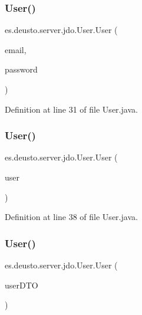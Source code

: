 \subsubsection{\texorpdfstring{User()}{User()}\hspace{0.1cm}{\footnotesize\ttfamily [1/3]}}
{\footnotesize\ttfamily es.\+deusto.\+server.\+jdo.\+User.\+User (\begin{DoxyParamCaption}\item[{String}]{email,  }\item[{String}]{password }\end{DoxyParamCaption})}



Definition at line 31 of file User.\+java.

\mbox{\label{classes_1_1deusto_1_1server_1_1jdo_1_1_user_a045d3217e3e459cd505de75ebb88243e}} 
\subsubsection{\texorpdfstring{User()}{User()}\hspace{0.1cm}{\footnotesize\ttfamily [2/3]}}
{\footnotesize\ttfamily es.\+deusto.\+server.\+jdo.\+User.\+User (\begin{DoxyParamCaption}\item[{\mbox{\hyperlink{classes_1_1deusto_1_1server_1_1data_1_1_user_details_d_t_o}{User\+Details\+D\+TO}}}]{user }\end{DoxyParamCaption})}



Definition at line 38 of file User.\+java.

\mbox{\label{classes_1_1deusto_1_1server_1_1jdo_1_1_user_aba393844e4f390b5756de0058777f9a5}} 
\subsubsection{\texorpdfstring{User()}{User()}\hspace{0.1cm}{\footnotesize\ttfamily [3/3]}}
{\footnotesize\ttfamily es.\+deusto.\+server.\+jdo.\+User.\+User (\begin{DoxyParamCaption}\item[{\mbox{\hyperlink{classes_1_1deusto_1_1server_1_1data_1_1_user_d_t_o}{User\+D\+TO}}}]{user\+D\+TO }\end{DoxyParamCaption})}



